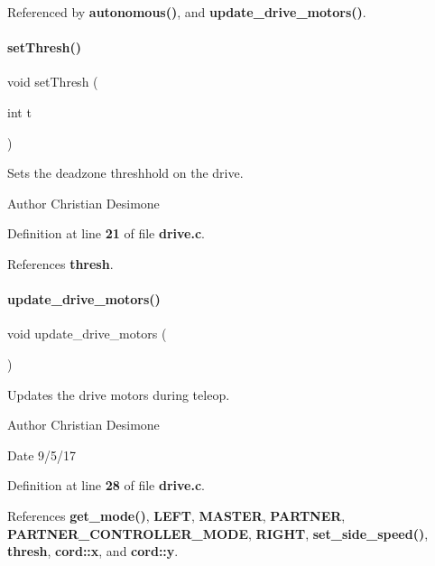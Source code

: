Referenced by \textbf{ autonomous()}, and \textbf{ update\+\_\+drive\+\_\+motors()}.

\mbox{\label{drive_8c_a53d6e35d53ec3e0b1b1c489d8203f204}} 
\paragraph{set\+Thresh()}
{\footnotesize\ttfamily void set\+Thresh (\begin{DoxyParamCaption}\item[{int}]{t }\end{DoxyParamCaption})}



Sets the deadzone threshhold on the drive. 

\begin{DoxyAuthor}{Author}
Christian Desimone 
\end{DoxyAuthor}


Definition at line \textbf{ 21} of file \textbf{ drive.\+c}.



References \textbf{ thresh}.

\mbox{\label{drive_8c_a8224a4626a934d30ed587671b7004bf8}} 
\paragraph{update\+\_\+drive\+\_\+motors()}
{\footnotesize\ttfamily void update\+\_\+drive\+\_\+motors (\begin{DoxyParamCaption}{ }\end{DoxyParamCaption})}



Updates the drive motors during teleop. 

\begin{DoxyAuthor}{Author}
Christian Desimone 
\end{DoxyAuthor}
\begin{DoxyDate}{Date}
9/5/17 
\end{DoxyDate}


Definition at line \textbf{ 28} of file \textbf{ drive.\+c}.



References \textbf{ get\+\_\+mode()}, \textbf{ L\+E\+FT}, \textbf{ M\+A\+S\+T\+ER}, \textbf{ P\+A\+R\+T\+N\+ER}, \textbf{ P\+A\+R\+T\+N\+E\+R\+\_\+\+C\+O\+N\+T\+R\+O\+L\+L\+E\+R\+\_\+\+M\+O\+DE}, \textbf{ R\+I\+G\+HT}, \textbf{ set\+\_\+side\+\_\+speed()}, \textbf{ thresh}, \textbf{ cord\+::x}, and \textbf{ cord\+::y}.



